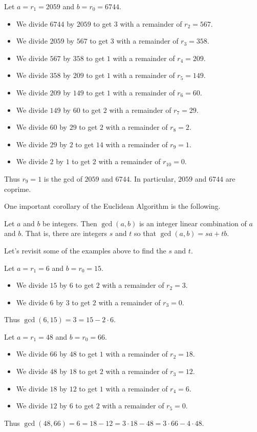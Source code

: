 \documentclass[11pt,dvipsnames]{book}
\numberwithin{figure}{section} %
\numberwithin{table}{section} %
\begin{document}
\begin{example}
Let $a = r_1 = 2059$ and $b = r_0 = 6744$.
\begin{itemize}
    \item We divide $6744$ by $2059$ to get $3$ with a remainder of $r_2=567$.
    \item We divide $2059$ by $567$ to get $3$ with a remainder of $r_3 = 358$.
    \item We divide $567$ by $358$ to get $1$ with a remainder of $r_4 = 209$.
    \item We divide $358$ by $209$ to get $1$ with a remainder of $r_5 = 149$.
    \item We divide $209$ by $149$ to get $1$ with a remainder of $r_6 = 60$.
    \item We divide $149$ by $60$ to get $2$ with a remainder of $r_7 = 29$.
    \item We divide $60$ by $29$ to get $2$ with a remainder of $r_8 = 2$.
    \item We divide $29$ by $2$ to get $14$ with a remainder of $r_9 = 1$.
    \item We divide $2$ by $1$ to get $2$ with a remainder of $r_{10} = 0$.
\end{itemize}
Thus $r_9 = 1$ is the gcd of $2059$ and $6744$.
In particular, $2059$ and $6744$ are coprime.
\end{example}

One important corollary of the Euclidean Algorithm is the following.
\begin{theorem}
\label{t:lincombgcd}
 Let $a$ and $b$ be integers.
 Then $\gcd(a,b)$ is an integer linear combination of $a$ and $b$.
 That is, there are integers $s$ and $t$ so that $\gcd(a,b)=sa+tb$.
\end{theorem}

Let's revisit some of the examples above to find the $s$ and $t$.
\begin{example}
Let $a = r_1 = 6$ and $b = r_0 = 15$.
\begin{itemize}
    \item We divide $15$ by $6$ to get $2$ with a remainder of $r_2=3$.
    \item We divide $6$ by $3$ to get $2$ with a remainder of $r_3 = 0$.
\end{itemize}
Thus $\gcd(6,15) = 3 = 15-2\cdot 6$.
\end{example}

\begin{example}
Let $a = r_1 = 48$ and $b = r_0 = 66$.
\begin{itemize}
    \item We divide $66$ by $48$ to get $1$ with a remainder of $r_2=18$.
    \item We divide $48$ by $18$ to get $2$ with a remainder of $r_3 = 12$.
    \item We divide $18$ by $12$ to get $1$ with a remainder of $r_4 = 6$.
    \item We divide $12$ by $6$ to get $2$ with a remainder of $r_5 = 0$.
\end{itemize}
Thus $\gcd(48,66) = 6 = 18-12 = 3\cdot 18-48 = 3\cdot 66 -4\cdot 48$.
\end{example}
\end{document}
